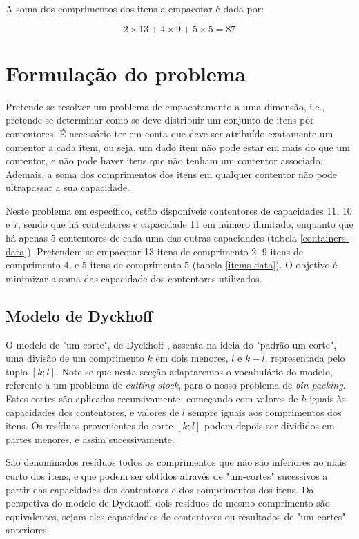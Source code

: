 \documentclass[12pt, a4paper, titlepage]{article}
\begin{document}
A soma dos comprimentos dos itens a empacotar é dada por:

$$2 \times 13 + 4 \times 9 + 5 \times 5 = 87$$

\section{Formulação do problema}

Pretende-se resolver um problema de empacotamento a uma dimensão, i.e., pretende-se determinar como
se deve distribuir um conjunto de itens por contentores. É necessário ter em conta que deve ser
atribuído exatamente um contentor a cada item, ou seja, um dado item não pode estar em mais do que
um contentor, e não pode haver itens que não tenham um contentor associado. Ademais, a soma dos
comprimentos dos itens em qualquer contentor não pode ultrapassar a sua capacidade.

Neste problema em específico, estão disponíveis contentores de capacidades 11, 10 e 7, sendo que há
contentores e capacidade 11 em número ilimitado, enquanto que há apenas 5 contentores de cada uma
das outras capacidades (tabela \ref{containers-data}). Pretendem-se empacotar 13 itens de
comprimento 2, 9 itens de comprimento 4, e 5 itens de comprimento 5 (tabela \ref{items-data}). O
objetivo é minimizar a soma das capacidade dos contentores utilizados.

\subsection{Modelo de Dyckhoff}

O modelo de "um-corte"{}, de Dyckhoff \cite{dyckhoff}, assenta na ideia do "padrão-um-corte", uma
divisão de um comprimento $k$ em dois menores, $l$ e $k - l$, representada pelo tuplo $[k; l]$.
Note-se que nesta secção adaptaremos o vocabulário do modelo, referente a um problema de
\emph{cutting stock}, para o nosso problema de \emph{bin packing}. Estes cortes são aplicados
recursivamente, começando com valores de $k$ iguais às capacidades dos contentores, e valores de $l$
sempre iguais aos comprimentos dos itens. Os resíduos provenientes do corte $[k; l]$ podem depois
ser divididos em partes menores, e assim sucessivamente.

São denominados resíduos todos os comprimentos que não são inferiores ao mais curto dos itens, e
que podem ser obtidos através de "um-cortes"{} sucessivos a partir das capacidades dos contentores e
dos comprimentos dos itens. Da perspetiva do modelo de Dyckhoff, dois resíduos do mesmo comprimento
são equivalentes, sejam eles capacidades de contentores ou resultados de "um-cortes"{} anteriores.
\end{document}

